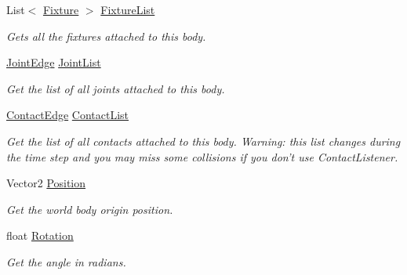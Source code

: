 \begin{DoxyCompactItemize}
List$<$ \hyperlink{class_farseer_physics_1_1_dynamics_1_1_fixture}{Fixture} $>$ \hyperlink{class_farseer_physics_1_1_dynamics_1_1_body_accbd764e3b9d421a0de41971adafe438}{Fixture\+List}
\begin{DoxyCompactList}\small\item\em Gets all the fixtures attached to this body. \end{DoxyCompactList}\item 
\hyperlink{class_farseer_physics_1_1_dynamics_1_1_joints_1_1_joint_edge}{Joint\+Edge} \hyperlink{class_farseer_physics_1_1_dynamics_1_1_body_a21c76880b4afe8e795ab7d44e57c8d0c}{Joint\+List}
\begin{DoxyCompactList}\small\item\em Get the list of all joints attached to this body. \end{DoxyCompactList}\item 
\hyperlink{class_farseer_physics_1_1_dynamics_1_1_contacts_1_1_contact_edge}{Contact\+Edge} \hyperlink{class_farseer_physics_1_1_dynamics_1_1_body_abf20705ae2317ab0ae2341160b64d2e5}{Contact\+List}
\begin{DoxyCompactList}\small\item\em Get the list of all contacts attached to this body. Warning\+: this list changes during the time step and you may miss some collisions if you don't use Contact\+Listener. \end{DoxyCompactList}\item 
Vector2 \hyperlink{class_farseer_physics_1_1_dynamics_1_1_body_af2aab101c6f73716258de178ad8c2623}{Position}
\begin{DoxyCompactList}\small\item\em Get the world body origin position. \end{DoxyCompactList}\item 
float \hyperlink{class_farseer_physics_1_1_dynamics_1_1_body_a1d6da6608037dec385cae198b6c3f356}{Rotation}
\begin{DoxyCompactList}\small\item\em Get the angle in radians. \end{DoxyCompactList}\item 

\end{DoxyCompactItemize}
